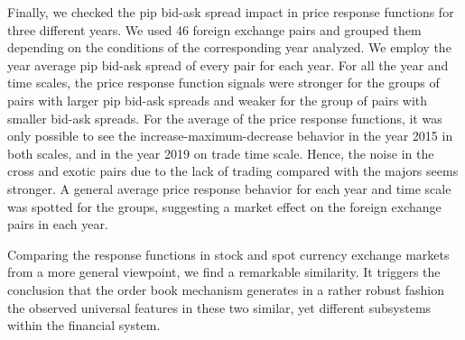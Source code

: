 Finally, we checked the pip bid-ask spread impact in price response functions
for three different years. We used 46 foreign exchange pairs and grouped them
depending on the conditions of the corresponding year analyzed. We employ the
year average pip bid-ask spread of every pair for each year. For all the year
and time scales, the price response function signals were stronger for the
groups of pairs with larger pip bid-ask spreads and weaker for the group of
pairs with smaller bid-ask spreads. For the average of the price response
functions, it was only possible to see the increase-maximum-decrease behavior
in the year 2015 in both scales, and in the year 2019 on trade time scale.
Hence, the noise in the cross and exotic pairs due to the lack of trading
compared with the majors seems stronger. A general average price response
behavior for each year and time scale was spotted for the groups, suggesting a
market effect on the foreign exchange pairs in each year.

Comparing the response functions in stock and spot currency exchange markets
from a more general viewpoint, we find a remarkable similarity. It triggers the
conclusion that the order book mechanism generates in a rather robust fashion
the observed universal features in these two similar, yet different subsystems
within the financial system.